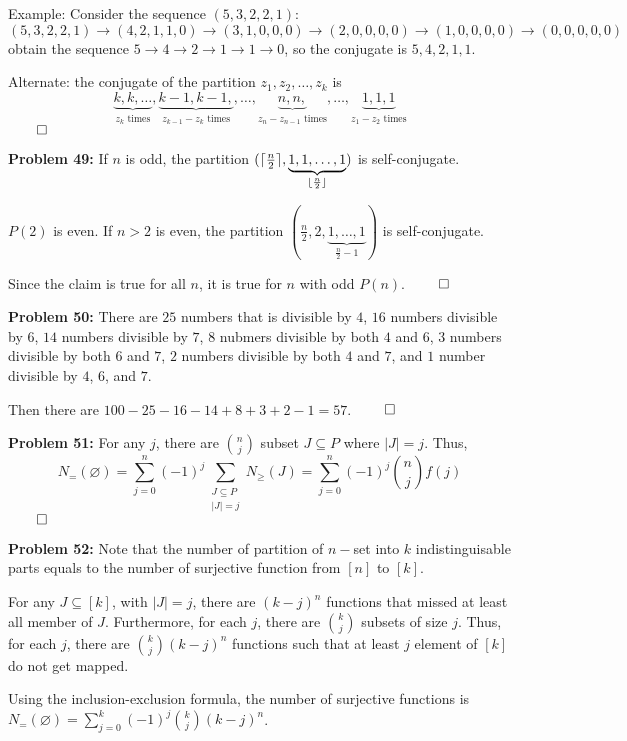 \documentclass[12pt]{article}
\DeclarePairedDelimiter{\ceil}{\lceil}{\rceil}
\DeclarePairedDelimiter{\floor}{\lfloor}{\rfloor}
\newcommand{\prob}[1]{\textbf{Problem #1:}}
\begin{document}
    Example: Consider the sequence $(5,3,2,2,1)$: 
    $$(5,3,2,2,1) \to (4,2,1,1,0) \to (3,1,0,0,0) \to (2,0,0,0,0) \to (1,0,0,0,0) \to (0,0,0,0,0)$$
    obtain the sequence
    $5 \to 4 \rightarrow 2 \to 1 \to 1 \to 0$, so the conjugate is $5,4,2,1,1$. 
    
    Alternate: the conjugate of the partition $z_1, z_2, \dots, z_k$ is $$\underbrace{k ,k, \dots}_{z_k \text{ times}}, \underbrace{k-1, k-1, }_{z_{k-1} - z_k \text{ times}} , \dots, \underbrace{n, n, }_{z_n - z_{n-1} \text{ times}}, \dots, \underbrace{1,1,1}_{z_1 - z_2 \text{ times}}$$ $\qed$
    
\prob{49} If $n$ is odd, the partition $(\ceil{\frac{n}{2}}, \underbrace{1,1,\dots ,1}_{\floor{\frac{n}{2}}})$ is self-conjugate. 

        $P(2)$ is even. If $n > 2$ is even, the partition $(\frac{n}{2}, 2, \underbrace{1, \dots, 1}_{\frac{n}{2} - 1})$ is self-conjugate.

        Since the claim is true for all $n$, it is true for $n$ with odd $P(n)$. $\qed$

\prob{50} There are $25$ numbers that is divisible by $4$, $16$ numbers divisible by $6$, $14$ numbers divisible by $7$, $8$ nubmers divisible by both $4$ and $6$, $3$ numbers divisible by both $6$ and $7$, $2$ numbers divisible by both $4$ and $7$, and $1$ number divisible by $4$, $6$, and $7$. 

Then there are $100 - 25-16-14+8+3+2-1 = 57$. $\qed$

\prob{51} For any $j$, there are $\binom{n}{j}$ subset $J \subseteq P$ where $|J| = j$. Thus, $$N_{=} (\varnothing) = \sum\limits^{n}_{j=0} (-1)^j \sum\limits_{\substack{J \subseteq P \\ |J| = j}} N_{\geq} (J) = \sum\limits^{n}_{j=0} (-1)^j \binom{n}{j} f(j)$$ $\qed$

\prob{52} Note that the number of partition of $n-$set into $k$ indistinguisable parts equals to the number of surjective function from $[n]$ to $[k]$.

For any $J \subseteq [k]$, with $|J| = j$, there are $(k-j)^n$ functions that missed at least all member of $J$. Furthermore, for each $j$, there are $\binom{k}{j}$ subsets of size $j$. Thus, for each $j$, there are $\binom{k}{j} (k-j)^n$ functions such that at least $j$ element of $[k]$ do not get mapped.

Using the inclusion-exclusion formula, the number of surjective functions is \\$N_{=}(\varnothing) = \sum\limits_{j=0}^k (-1)^j \binom{k}{j} (k-j)^n$.
\end{document}

